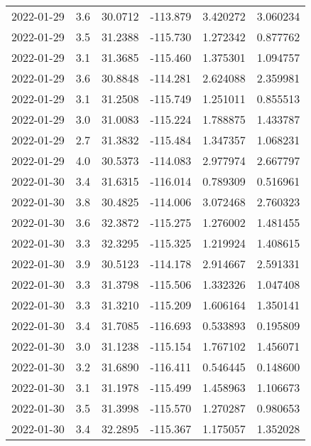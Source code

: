 \begin{tabular}{lrrrrr}
2022-01-29 &       3.6 &  30.0712 &  -113.879 &         3.420272 &         3.060234 \\
2022-01-29 &       3.5 &  31.2388 &  -115.730 &         1.272342 &         0.877762 \\
2022-01-29 &       3.1 &  31.3685 &  -115.460 &         1.375301 &         1.094757 \\
2022-01-29 &       3.6 &  30.8848 &  -114.281 &         2.624088 &         2.359981 \\
2022-01-29 &       3.1 &  31.2508 &  -115.749 &         1.251011 &         0.855513 \\
2022-01-29 &       3.0 &  31.0083 &  -115.224 &         1.788875 &         1.433787 \\
2022-01-29 &       2.7 &  31.3832 &  -115.484 &         1.347357 &         1.068231 \\
2022-01-29 &       4.0 &  30.5373 &  -114.083 &         2.977974 &         2.667797 \\
2022-01-30 &       3.4 &  31.6315 &  -116.014 &         0.789309 &         0.516961 \\
2022-01-30 &       3.8 &  30.4825 &  -114.006 &         3.072468 &         2.760323 \\
2022-01-30 &       3.6 &  32.3872 &  -115.275 &         1.276002 &         1.481455 \\
2022-01-30 &       3.3 &  32.3295 &  -115.325 &         1.219924 &         1.408615 \\
2022-01-30 &       3.9 &  30.5123 &  -114.178 &         2.914667 &         2.591331 \\
2022-01-30 &       3.3 &  31.3798 &  -115.506 &         1.332326 &         1.047408 \\
2022-01-30 &       3.3 &  31.3210 &  -115.209 &         1.606164 &         1.350141 \\
2022-01-30 &       3.4 &  31.7085 &  -116.693 &         0.533893 &         0.195809 \\
2022-01-30 &       3.0 &  31.1238 &  -115.154 &         1.767102 &         1.456071 \\
2022-01-30 &       3.2 &  31.6890 &  -116.411 &         0.546445 &         0.148600 \\
2022-01-30 &       3.1 &  31.1978 &  -115.499 &         1.458963 &         1.106673 \\
2022-01-30 &       3.5 &  31.3998 &  -115.570 &         1.270287 &         0.980653 \\
2022-01-30 &       3.4 &  32.2895 &  -115.367 &         1.175057 &         1.352028 \\

\end{tabular}
